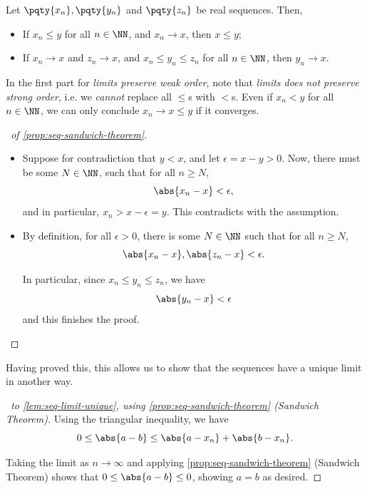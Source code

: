 \begin{proposition}
    \label{prop:seq-sandwich-theorem}%
    Let \(\pqty{x_n}, \pqty{y_n}\) and \(\pqty{z_n}\) be real sequences. Then,
    \begin{itemize}
        \item {} If \(x_n \leq y\) for all \(n \in \NN\), and \(x_n \to x\), then \(x \leq y\);
        \item {} If \(x_n \to x\) and \(z_n \to x\), and \(x_n \leq y_n \leq z_n\) for all \(n \in \NN\), then \(y_n \to x\).
    \end{itemize}
\end{proposition}

\begin{remark}
    In the first part for \emph{limits preserve weak order}, note that \emph{limits does not preserve strong order}, i.e. we \emph{cannot} replace all \(\leq\)s with \(<\)s. Even if \(x_n < y\) for all \(n \in \NN\), we can only conclude \(x_n \to x \leq y\) if it converges.
\end{remark}

\begin{proof}[\proofname\ of \autoref{prop:seq-sandwich-theorem}]
    \begin{itemize}
        \item Suppose for contradiction that \(y < x\), and let \(\epsilon = x - y > 0\). Now, there must be some \(N \in \NN\), such that for all \(n \geq N\),
        \[
            \abs{x_n - x} < \epsilon,
        \]
        and in particular, \(x_n > x - \epsilon = y\). This contradicts with the assumption.

        \item By definition, for all \(\epsilon > 0\), there is some \(N \in \NN\) such that for all \(n \geq N\),
        \[
            \abs{x_n - x}, \abs{z_n - x} < \epsilon.
        \]

        In particular, since \(x_n \leq y_n \leq z_n\), we have
        \[
            \abs{y_n - x} < \epsilon
        \]
        and this finishes the proof.
    \end{itemize}
\end{proof}

Having proved this, this allows us to show that the sequences have a unique limit in another way.

\begin{proof}[\proofname\ to \autoref{lem:seq-limit-unique}, using \autoref{prop:seq-sandwich-theorem} (Sandwich Theorem)]
    Using the triangular inequality, we have
    \[
        0 \leq \abs{a - b} \leq \abs{a - x_n} + \abs{b - x_n}.
    \]

    Taking the limit as \(n \to \infty\) and applying \autoref{prop:seq-sandwich-theorem} (Sandwich Theorem) shows that \(0 \leq \abs{a - b} \leq 0\), showing \(a = b\) as desired.
\end{proof}

